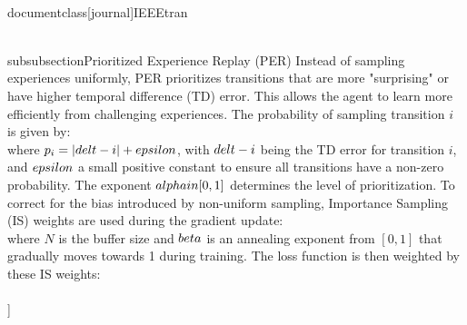 \\documentclass[journal]{IEEEtran}
\begin{document}
\\subsubsection{Prioritized Experience Replay (PER)}
Instead of sampling experiences uniformly, PER \cite{schaul2015prioritized} prioritizes transitions that are more "surprising" or have higher temporal difference (TD) error. This allows the agent to learn more efficiently from challenging experiences.
The probability of sampling transition $i$ is given by:
\\[
P(i) = \\frac{p_i^\\alpha}{\\sum_k p_k^\\alpha}
\\]
where $p_i = |\\delt-i| + \\epsilon$, with $\\delt-i$ being the TD error for transition $i$, and $\\epsilon$ a small positive constant to ensure all transitions have a non-zero probability. The exponent $\\alpha \\in [0, 1]$ determines the level of prioritization. To correct for the bias introduced by non-uniform sampling, Importance Sampling (IS) weights are used during the gradient update:
\\[
w_i = \\left( \\frac{1}{N} \\cdot \\frac{1}{P(i)} \\right)^\\beta
\\]
where $N$ is the buffer size and $\\beta$ is an annealing exponent from $[0, 1]$ that gradually moves towards 1 during training. The loss function is then weighted by these IS weights:
\\[
L_{PER}(\\theta) = \\mathbb{E}_{(s,a,r,s\',d) \\sim P(\\mathcal{D})} \\left[ w_i \\left( y_t - Q(s_t, a_t; \\theta) \\right)^2 \\right]
\\]
\end{document}
